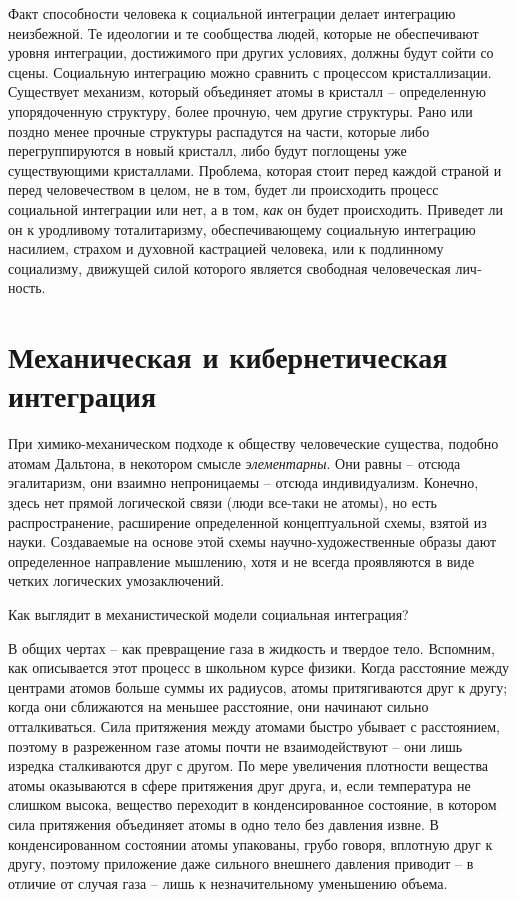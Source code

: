 \documentclass{book}
\begin{document}
Факт способности человека к социальной интеграции делает интеграцию неизбежной. Те идеологии и те сообщества людей, которые не обеспечивают уровня интеграции, достижимого при других условиях, должны будут сойти со сцены. Социаль­ную интеграцию можно сравнить с процессом кристаллизации. Существует механизм, который объединяет атомы в кристалл -- определенную упорядоченную структуру, более прочную, чем другие структуры. Рано или поздно менее прочные структуры распадутся на части, которые либо перегруппируются в новый кристалл, либо будут поглощены уже существующими крис­таллами. Проблема, которая стоит перед каждой страной и перед человечеством в целом, не в том, будет ли происходить про­цесс социальной интеграции или нет, а в том, \textit{как}  он будет про­исходить. Приведет ли он к уродливому тоталитаризму, обеспечивающему социальную интеграцию насилием, страхом и духов­ной кастрацией человека, или к подлинному социализму, дви­жущей силой которого является свободная человеческая лич­ность.


\section{Механическая и кибернетическая интеграция}

При химико-механическом подходе к обществу человече­ские существа, подобно атомам Дальтона, в некотором смысле \textit{элементарны}.  Они равны -- отсюда эгалитаризм, они взаимно непроницаемы -- отсюда индивидуализм. Конечно, здесь нет прямой логической связи (люди все-таки не атомы), но есть распространение, расширение определенной концептуальной схе­мы, взятой из науки. Создаваемые на основе этой схемы науч­но-художественные образы дают определенное направление мышлению, хотя и не всегда проявляются в виде четких ло­гических умозаключений.

Как выглядит в механистической модели социальная интег­рация?

В общих чертах -- как превращение газа в жидкость и твер­дое тело. Вспомним, как описывается этот процесс в школь­ном курсе физики. Когда расстояние между центрами атомов больше суммы их радиусов, атомы притягиваются друг к другу; когда они сближаются на меньшее расстояние, они начи­нают сильно отталкиваться. Сила притяжения между атомами быстро убывает с расстоянием, поэтому в разреженном газе атомы почти не взаимодействуют -- они лишь изредка сталки­ваются друг с другом. По мере увеличения плотности вещест­ва атомы оказываются в сфере притяжения друг друга, и, если температура не слишком высока, вещество переходит в кон­денсированное состояние, в котором сила притяжения объе­диняет атомы в одно тело без давления извне. В конденсиро­ванном состоянии атомы упакованы, грубо говоря, вплотную друг к другу, поэтому приложение даже сильного внешнего давления приводит -- в отличие от случая газа -- лишь к незна­чительному уменьшению объема.
\end{document}
